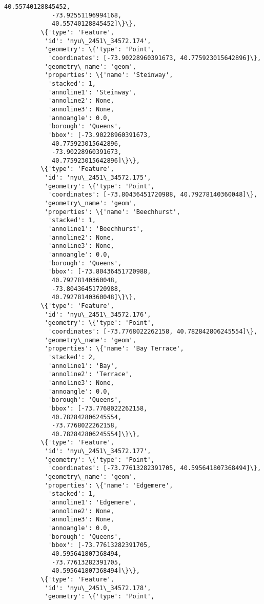 \documentclass[11pt]{article}
\begin{document}
\begin{Verbatim}[commandchars=\\\{\}]
             40.55740128845452,
             -73.92551196994168,
             40.55740128845452]\}\},
          \{'type': 'Feature',
           'id': 'nyu\_2451\_34572.174',
           'geometry': \{'type': 'Point',
            'coordinates': [-73.90228960391673, 40.775923015642896]\},
           'geometry\_name': 'geom',
           'properties': \{'name': 'Steinway',
            'stacked': 1,
            'annoline1': 'Steinway',
            'annoline2': None,
            'annoline3': None,
            'annoangle': 0.0,
            'borough': 'Queens',
            'bbox': [-73.90228960391673,
             40.775923015642896,
             -73.90228960391673,
             40.775923015642896]\}\},
          \{'type': 'Feature',
           'id': 'nyu\_2451\_34572.175',
           'geometry': \{'type': 'Point',
            'coordinates': [-73.80436451720988, 40.79278140360048]\},
           'geometry\_name': 'geom',
           'properties': \{'name': 'Beechhurst',
            'stacked': 1,
            'annoline1': 'Beechhurst',
            'annoline2': None,
            'annoline3': None,
            'annoangle': 0.0,
            'borough': 'Queens',
            'bbox': [-73.80436451720988,
             40.79278140360048,
             -73.80436451720988,
             40.79278140360048]\}\},
          \{'type': 'Feature',
           'id': 'nyu\_2451\_34572.176',
           'geometry': \{'type': 'Point',
            'coordinates': [-73.7768022262158, 40.782842806245554]\},
           'geometry\_name': 'geom',
           'properties': \{'name': 'Bay Terrace',
            'stacked': 2,
            'annoline1': 'Bay',
            'annoline2': 'Terrace',
            'annoline3': None,
            'annoangle': 0.0,
            'borough': 'Queens',
            'bbox': [-73.7768022262158,
             40.782842806245554,
             -73.7768022262158,
             40.782842806245554]\}\},
          \{'type': 'Feature',
           'id': 'nyu\_2451\_34572.177',
           'geometry': \{'type': 'Point',
            'coordinates': [-73.77613282391705, 40.595641807368494]\},
           'geometry\_name': 'geom',
           'properties': \{'name': 'Edgemere',
            'stacked': 1,
            'annoline1': 'Edgemere',
            'annoline2': None,
            'annoline3': None,
            'annoangle': 0.0,
            'borough': 'Queens',
            'bbox': [-73.77613282391705,
             40.595641807368494,
             -73.77613282391705,
             40.595641807368494]\}\},
          \{'type': 'Feature',
           'id': 'nyu\_2451\_34572.178',
           'geometry': \{'type': 'Point',

\end{Verbatim}
\end{document}
